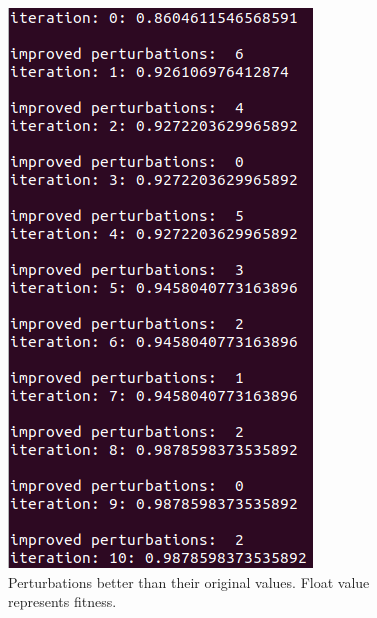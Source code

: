 \documentclass[12pt]{article}
\begin{document}
\begin{figure}[H]
\begin{minipage}{.45\textwidth}
  \includegraphics[width=.95\linewidth]{images/p1_perturbations_hc}
  \caption{Perturbations better than their original values. Float value represents fitness.}
  \label{fig:p1_pert}
\end{minipage}
\end{figure}
\end{document}
